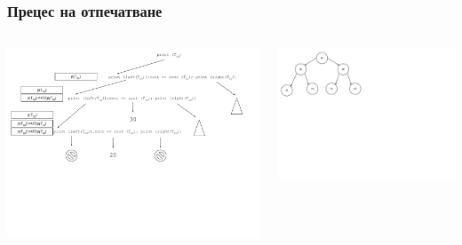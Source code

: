 \documentclass{beamer}
\begin{document}
\begin{frame}[fragile]
\frametitle{Прецес на отпечатване}



\begin{columns}[t]
  \begin{column}{0.65\textwidth}
\includegraphics[width=13cm]{images/tree_print_process_stack}
  \end{column}
  \begin{column}{0.35\textwidth}
  \vspace{-140px}
\includegraphics[width=9cm]{images/tree_bot_clean}

  \end{column}
\end{columns}
\end{frame}
\end{document}
